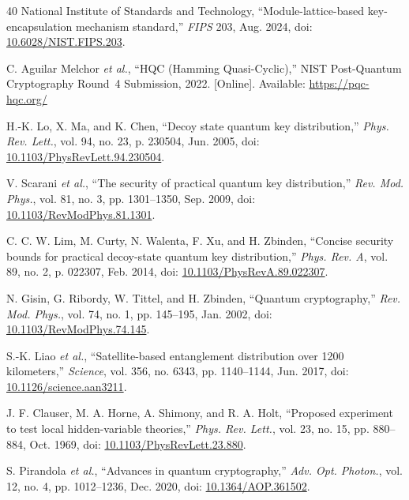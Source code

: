 \documentclass[conference]{IEEEtran}
\begin{document}
\begin{thebibliography}{40}
National Institute of Standards and Technology, ``Module-lattice-based key-encapsulation mechanism standard,'' \emph{FIPS} 203, Aug. 2024, doi: \href{https://doi.org/10.6028/NIST.FIPS.203}{10.6028/NIST.FIPS.203}.

C. Aguilar Melchor \emph{et al.}, ``HQC (Hamming Quasi-Cyclic),'' NIST Post-Quantum Cryptography Round~4 Submission, 2022. [Online]. Available: \url{https://pqc-hqc.org/}

H.-K. Lo, X. Ma, and K. Chen, ``Decoy state quantum key distribution,'' \emph{Phys. Rev. Lett.}, vol. 94, no. 23, p. 230504, Jun. 2005, doi: \href{https://doi.org/10.1103/PhysRevLett.94.230504}{10.1103/PhysRevLett.94.230504}.

V. Scarani \emph{et al.}, ``The security of practical quantum key distribution,'' \emph{Rev. Mod. Phys.}, vol. 81, no. 3, pp. 1301--1350, Sep. 2009, doi: \href{https://doi.org/10.1103/RevModPhys.81.1301}{10.1103/RevModPhys.81.1301}.

C. C. W. Lim, M. Curty, N. Walenta, F. Xu, and H. Zbinden, ``Concise security bounds for practical decoy-state quantum key distribution,'' \emph{Phys. Rev. A}, vol. 89, no. 2, p. 022307, Feb. 2014, doi: \href{https://doi.org/10.1103/PhysRevA.89.022307}{10.1103/PhysRevA.89.022307}.

N. Gisin, G. Ribordy, W. Tittel, and H. Zbinden, ``Quantum cryptography,'' \emph{Rev. Mod. Phys.}, vol. 74, no. 1, pp. 145--195, Jan. 2002, doi: \href{https://doi.org/10.1103/RevModPhys.74.145}{10.1103/RevModPhys.74.145}.

S.-K. Liao \emph{et al.}, ``Satellite-based entanglement distribution over 1200 kilometers,'' \emph{Science}, vol. 356, no. 6343, pp. 1140--1144, Jun. 2017, doi: \href{https://doi.org/10.1126/science.aan3211}{10.1126/science.aan3211}.

J. F. Clauser, M. A. Horne, A. Shimony, and R. A. Holt, ``Proposed experiment to test local hidden-variable theories,'' \emph{Phys. Rev. Lett.}, vol. 23, no. 15, pp. 880--884, Oct. 1969, doi: \href{https://doi.org/10.1103/PhysRevLett.23.880}{10.1103/PhysRevLett.23.880}.

S. Pirandola \emph{et al.}, ``Advances in quantum cryptography,'' \emph{Adv. Opt. Photon.}, vol. 12, no. 4, pp. 1012--1236, Dec. 2020, doi: \href{https://doi.org/10.1364/AOP.361502}{10.1364/AOP.361502}.


\end{thebibliography}
\end{document}
